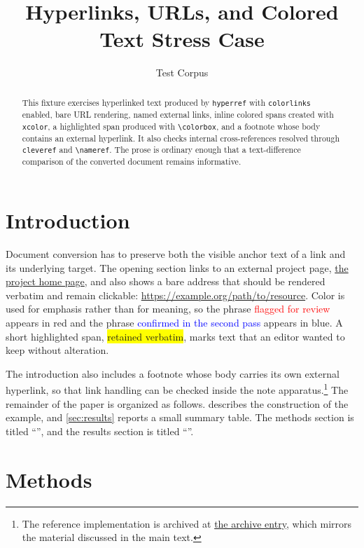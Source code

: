 \documentclass[11pt]{article}
\title{Hyperlinks, URLs, and Colored Text Stress Case}
\author{Test Corpus}
\date{}
\begin{document}
\maketitle

\begin{abstract}
This fixture exercises hyperlinked text produced by \texttt{hyperref} with
\texttt{colorlinks} enabled, bare URL rendering, named external links, inline
colored spans created with \texttt{xcolor}, a highlighted span produced with
\verb|\colorbox|, and a footnote whose body contains an external hyperlink. It
also checks internal cross-references resolved through \texttt{cleveref} and
\verb|\nameref|. The prose is ordinary enough that a text-difference comparison
of the converted document remains informative.
\end{abstract}

\section{Introduction}
\label{sec:introduction}

Document conversion has to preserve both the visible anchor text of a link and
its underlying target. The opening section links to an external project page,
\href{https://example.org}{the project home page}, and also shows a bare
address that should be rendered verbatim and remain clickable:
\url{https://example.org/path/to/resource}. Color is used for emphasis rather
than for meaning, so the phrase \textcolor{red}{flagged for review} appears in
red and the phrase \textcolor{blue}{confirmed in the second pass} appears in
blue. A short highlighted span, \colorbox{yellow}{retained verbatim}, marks
text that an editor wanted to keep without alteration.

The introduction also includes a footnote whose body carries its own external
hyperlink, so that link handling can be checked inside the note
apparatus.\footnote{The reference implementation is archived at
\href{https://example.org/archive}{the archive entry}, which mirrors the
material discussed in the main text.} The remainder of the paper is organized as
follows.  describes the construction of the example, and
\cref{sec:results} reports a small summary table. The methods section is titled
``'', and the results section is titled
``''.

\section{Methods}
\label{sec:methods}
\end{document}
